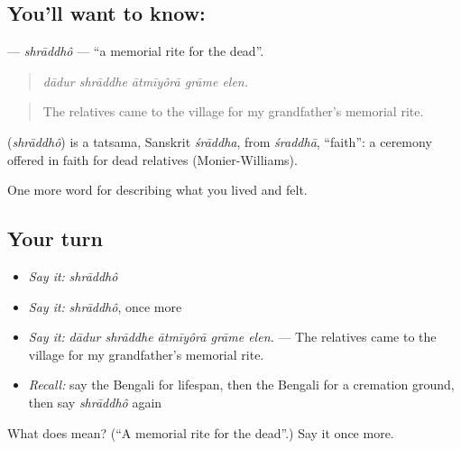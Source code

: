 \subsection*{You'll want to know: }
\textbf{} — \emph{shrāddhô} — \textquotedblleft{}a memorial rite for the dead\textquotedblright{}.

\begin{quote}
    
\end{quote}

\begin{quote}
\emph{dādur shrāddhe ātmīyôrā grāme elen.}
\end{quote}

\begin{quote}
The relatives came to the village for my grandfather's memorial rite.
\end{quote}

\begin{cousinweb}
\textbf{} (\emph{shrāddhô}) is a tatsama, Sanskrit \emph{śrāddha}, from \emph{śraddhā}, \textquotedblleft{}faith\textquotedblright{}: a ceremony offered in faith for dead relatives (Monier-Williams).
\end{cousinweb}

\begin{grammarlens}[title={What you've built}]
One more word for describing what you lived and felt.
\end{grammarlens}

\subsection*{Your turn}
\begin{itemize}
\raggedright
  \item \emph{Say it:} \emph{shrāddhô}
  \item \emph{Say it:} \emph{shrāddhô}, once more
  \item \emph{Say it:} \emph{dādur shrāddhe ātmīyôrā grāme elen.} — The relatives came to the village for my grandfather's memorial rite.
  \item \emph{Recall:} say the Bengali for lifespan, then the Bengali for a cremation ground, then say \emph{shrāddhô} again
\end{itemize}

\begin{tcolorbox}[breakable,colback=teal!4,colframe=teal!35!black,title={Before you move on}]
What does  mean? (\textquotedblleft{}A memorial rite for the dead\textquotedblright{}.) Say it once more.
\end{tcolorbox}
